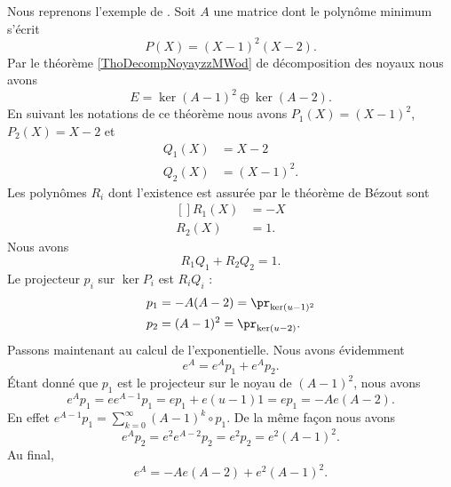 Nous reprenons l'exemple de \cite{MneimneReduct}. Soit \( A\) une matrice dont le polynôme minimum s'écrit
\begin{equation}
    P(X)=(X-1)^2(X-2).
\end{equation}
Par le théorème \ref{ThoDecompNoyayzzMWod} de décomposition des noyaux nous avons
\begin{equation}
    E=\ker(A-1)^2\oplus\ker(A-2).
\end{equation}
En suivant les notations de ce théorème nous avons \( P_1(X)=(X-1)^2\), \( P_2(X)=X-2\) et
\begin{subequations}
    \begin{align}
        Q_1(X)&=X-2\\
        Q_2(X)&=(X-1)^2.
    \end{align}
\end{subequations}
Les polynômes \( R_i\) dont l'existence est assurée par le théorème de Bézout sont
\begin{equation}
    \begin{aligned}[]
        R_1(X)&=-X\\
        R_2(X)&=1.
    \end{aligned}
\end{equation}
Nous avons
\begin{equation}
    R_1Q_1+R_2Q_2=1.
\end{equation}
Le projecteur \( p_i\) sur \( \ker P_i\) est \( R_iQ_i\) :
\begin{equation}
    \begin{aligned}[]
        p_1&=-A(A-2)=\pr_{\ker(u-1)^2}\\
        p_2&=(A-1)^2=\pr_{\ker(u-2)}.
    \end{aligned}
\end{equation}
Passons maintenant au calcul de l'exponentielle. Nous avons évidemment
\begin{equation}
    e^A=e^Ap_1+e^Ap_2.
\end{equation}
Étant donné que \( p_1\) est le projecteur sur le noyau de \( (A-1)^2\), nous avons
\begin{equation}
    e^Ap_1=ee^{A-1}p_1=ep_1+e(u-1)1=ep_1=-Ae(A-2).
\end{equation}
En effet \( e^{A-1}p_1=\sum_{k=0}^{\infty}(A-1)^k\circ p_1\). De la même façon nous avons
\begin{equation}
    e^Ap_2=e^2e^{A-2}p_2=e^2p_2=e^2(A-1)^2.
\end{equation}
Au final,
\begin{equation}
    e^A=-Ae(A-2)+e^2(A-1)^2.
\end{equation}

